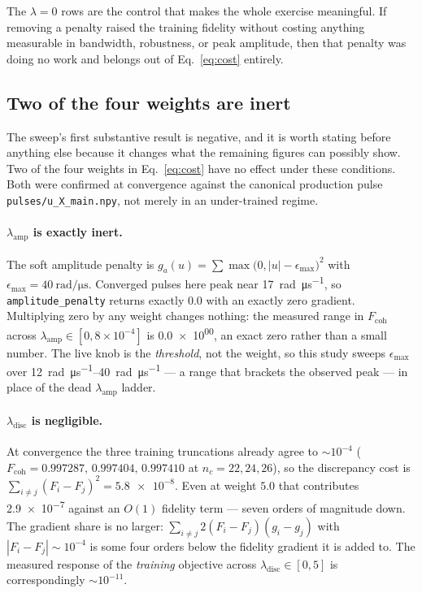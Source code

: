 \documentclass[11pt]{article}
\newcommand{\lama}{\lambda_{\mathrm{amp}}}
\newcommand{\lamdisc}{\lambda_{\mathrm{disc}}}
\begin{document}
The $\lambda = 0$ rows are the control that makes the whole exercise meaningful. If removing a
penalty raised the training fidelity without costing anything measurable in bandwidth,
robustness, or peak amplitude, then that penalty was doing no work and belongs out of
Eq.~\eqref{eq:cost} entirely.

\subsection{Two of the four weights are inert}
\label{sec:inert}

The sweep's first substantive result is negative, and it is worth stating before anything else
because it changes what the remaining figures can possibly show. Two of the four weights in
Eq.~\eqref{eq:cost} have no effect under these conditions. Both were confirmed at convergence
against the canonical production pulse \texttt{pulses/u\_X\_main.npy}, not merely in an
under-trained regime.

\paragraph{$\lama$ is exactly inert.}
The soft amplitude penalty is $g_a(u) = \sum \max\bigl(0, |u| - \epsilon_{\max}\bigr)^2$ with
$\epsilon_{\max} = \SI{40}{\radian\per\micro\second}$. Converged pulses here peak near
\SI{17}{\radian\per\micro\second}, so \texttt{amplitude\_penalty} returns exactly \num{0.0} with
an exactly zero gradient. Multiplying zero by any weight changes nothing: the measured range in
$F_{\mathrm{coh}}$ across $\lama \in [0, 8\times10^{-4}]$ is \num{0.0e+00}, an exact zero rather
than a small number. The live knob is the \emph{threshold}, not the weight, so this study sweeps
$\epsilon_{\max}$ over \SIrange{12}{40}{\radian\per\micro\second} --- a range that brackets the
observed peak --- in place of the dead $\lama$ ladder.

\paragraph{$\lamdisc$ is negligible.}
At convergence the three training truncations already agree to $\sim 10^{-4}$
($F_{\mathrm{coh}} = 0.997287,\, 0.997404,\, 0.997410$ at $n_c = 22, 24, 26$), so the
discrepancy cost is $\sum_{i \neq j}(F_i - F_j)^2 = \num{5.8e-8}$. Even at weight $5.0$ that
contributes \num{2.9e-7} against an $O(1)$ fidelity term --- seven orders of magnitude down.
The gradient share is no larger: $\sum_{i\neq j} 2(F_i - F_j)(g_i - g_j)$ with
$|F_i - F_j| \sim 10^{-4}$ is some four orders below the fidelity gradient it is added to. The
measured response of the \emph{training} objective across $\lamdisc \in [0,5]$ is
correspondingly $\sim 10^{-11}$.
\end{document}
